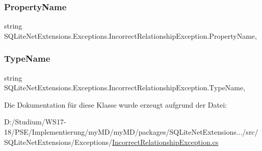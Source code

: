 \subsubsection{\texorpdfstring{Property\+Name}{PropertyName}}
{\footnotesize\ttfamily string S\+Q\+Lite\+Net\+Extensions.\+Exceptions.\+Incorrect\+Relationship\+Exception.\+Property\+Name\hspace{0.3cm}{\ttfamily [get]}, {\ttfamily [set]}}

\mbox{\label{class_s_q_lite_net_extensions_1_1_exceptions_1_1_incorrect_relationship_exception_ae6b9142924bef5a986b740d7be71fdd5}} 
\subsubsection{\texorpdfstring{Type\+Name}{TypeName}}
{\footnotesize\ttfamily string S\+Q\+Lite\+Net\+Extensions.\+Exceptions.\+Incorrect\+Relationship\+Exception.\+Type\+Name\hspace{0.3cm}{\ttfamily [get]}, {\ttfamily [set]}}



Die Dokumentation für diese Klasse wurde erzeugt aufgrund der Datei\+:\begin{DoxyCompactItemize}
\item 
D\+:/\+Studium/\+W\+S17-\/18/\+P\+S\+E/\+Implementierung/my\+M\+D/my\+M\+D/packages/\+S\+Q\+Lite\+Net\+Extensions.../src/\+S\+Q\+Lite\+Net\+Extensions/\+Exceptions/\mbox{\hyperlink{_incorrect_relationship_exception_8cs}{Incorrect\+Relationship\+Exception.\+cs}}\end{DoxyCompactItemize}
